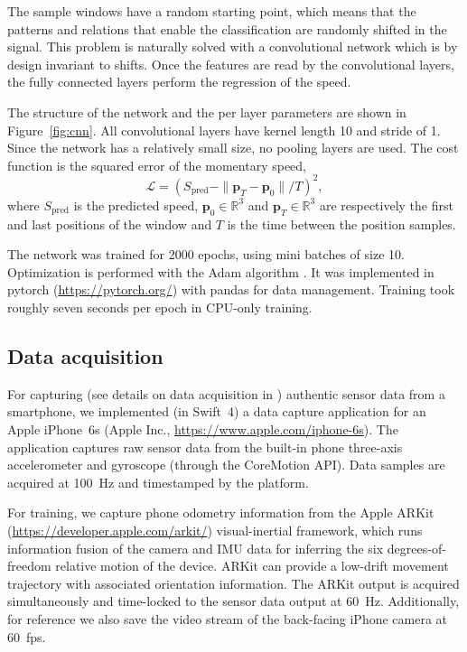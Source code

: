 \documentclass{article}
\providecommand{\norm}[1]{\|#1\|}
\newcommand{\mbf}[1]{\mathbf{#1}}
\newcommand{\vect}[1]{\mbf{#1}}
\begin{document}
The sample windows have a random starting point, which means that the patterns and relations that enable the classification are randomly shifted in the signal. This problem is naturally solved with a convolutional network which is by design invariant to shifts. Once the features are read by the convolutional layers, the fully connected layers perform the regression of the speed.

The structure of the network and the per layer parameters are shown in Figure~\ref{fig:cnn}. All convolutional layers have kernel length 10 and stride of 1. Since the network has a relatively small size, no pooling layers are used. The cost function is the squared error of the momentary speed,
\begin{equation}
  \mathcal{L} = {(S_\mathrm{pred} - \norm{\vect{p}_{T}-\vect{p}_0}/T)}^2,
\end{equation}
where $S_\mathrm{pred}$ is the predicted speed, $\vect{p}_0 \in \mathbb{R}^3$ and $\vect{p}_T \in \mathbb{R}^3$ are respectively the first and last positions of the window and $T$ is the time between the position samples.

The network was trained for 2000 epochs, using mini batches of size 10. Optimization is performed with the Adam algorithm \cite{Kingma+Ba:2014}. It was implemented in pytorch (\url{https://pytorch.org/}) with pandas for data management. Training took roughly seven seconds per epoch in CPU-only training. 




\subsection{Data acquisition}
\label{sec:data-acquisition}
For capturing (see details on data acquisition in \cite{Cortes+Solin+Rahtu+Kannala:2018-ADVIO}) authentic sensor data from a smartphone, we implemented (in Swift~4) a data capture application for an Apple iPhone~6s (Apple Inc., \url{https://www.apple.com/iphone-6s}). The application captures raw sensor data from the built-in phone three-axis accelerometer and gyroscope (through the CoreMotion API). Data samples are acquired at 100~Hz and timestamped by the platform. 

For training, we capture phone odometry information from the Apple ARKit (\url{https://developer.apple.com/arkit/}) visual-inertial framework, which runs information fusion of the camera and IMU data for inferring the six degrees-of-freedom relative motion of the device. ARKit can provide a low-drift movement trajectory with associated orientation information. The ARKit output is acquired simultaneously and time-locked to the sensor data output at 60~Hz. Additionally, for reference we also save the video stream of the back-facing iPhone camera at 60~fps.
\end{document}

